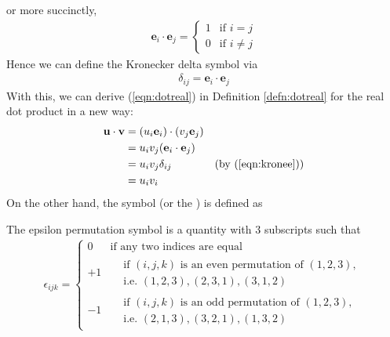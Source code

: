 or more succinctly,
\begin{align}
\textbf{e}_i \cdot \textbf{e}_j = \begin{cases}
1 & \text{if $i=j$} \\
0 & \text{if $i\neq j$}
\end{cases}    
\end{align}
Hence we can define the Kronecker delta symbol via
\begin{align}
\delta_{ij} = \textbf{e}_i \cdot \textbf{e}_j \label{eqn:kronee}
\end{align}
With this, we can derive (\ref{eqn:dotreal}) in Definition \ref{defn:dotreal} for the real dot product in a new way:
\begin{align}
\textbf{u} \cdot \textbf{v} &= (u_i \textbf{e}_i) \cdot (v_j \textbf{e}_j) \nonumber \\
&= u_iv_j (\textbf{e}_i \cdot \textbf{e}_j) \nonumber \\
&= u_iv_j \delta_{ij} & \text{(by (\ref{eqn:kronee}))} \nonumber \\
&= u_iv_i \label{eqn:dotind}
\end{align}
On the other hand, the  symbol (or the ) is defined as
\begin{defn}
\label{defn:epsilon}
The epsilon permutation symbol is a quantity with $3$ subscripts such that
\begin{align}
\label{eqn:epsilon}
\epsilon_{ijk} =
\begin{cases}
0 & \text{if any two indices are equal} \\
+1 & \begin{aligned}
&\text{if $(i,j,k)$ is an even permutation of $(1,2,3)$,} \\
&\text{i.e.\ $(1,2,3), (2,3,1), (3,1,2)$}
\end{aligned}  \\
-1 & \begin{aligned}
&\text{if $(i,j,k)$ is an odd permutation of $(1,2,3)$,} \\
&\text{i.e.\ $(2,1,3), (3,2,1), (1,3,2)$}
\end{aligned}
\end{cases}    
\end{align}
\end{defn}

